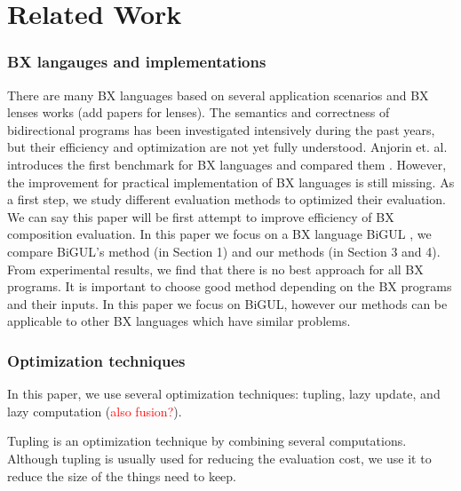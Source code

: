 \section{Related Work}

\subsubsection*{BX langauges and implementations}

There are many BX languages \cite{josh_pepm} \cite{BXtend} \cite{eMoflon} \cite{EVL+Strace} \cite{JTL} \cite{NMF}
based on several application scenarios and BX lenses works \cite{} (add papers for lenses). The semantics and correctness of bidirectional programs has been investigated intensively during the past years, but their efficiency and optimization are not yet fully understood. Anjorin et. al. introduces the first benchmark for BX languages and compared them \cite{BXcomp}. However, the improvement for practical implementation of BX languages is still missing. As a first step, we study different evaluation methods to optimized their evaluation. We can say this paper will be first attempt to improve efficiency of BX composition evaluation. In this paper we focus on a BX language BiGUL \cite{josh_pepm} \cite{josh_popl}, we compare BiGUL's method (in Section 1) and our methods (in Section 3 and 4). From experimental results, we find that there is no best approach for all BX programs. It is important to choose good method depending on the BX programs and their inputs. In this paper we focus on BiGUL, however our methods can be applicable to other BX languages which have similar problems.

\subsubsection*{Optimization techniques}

In this paper, we use several optimization techniques: tupling, lazy update, and lazy computation (\textcolor{red}{also fusion?}).

Tupling \cite{tupling} is an optimization technique by combining several computations. Although tupling is usually used for reducing the evaluation cost\cite{}, we use it to reduce the size of the things need to keep.

